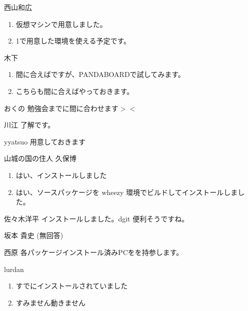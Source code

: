 \documentclass[mingoth,a4paper]{jsarticle}
\begin{document}
\begin{prework}{ 西山和広 }
  \begin{enumerate}
  \item 仮想マシンで用意しました。
  \item 1で用意した環境を使える予定です。
  \end{enumerate}
\end{prework}

\begin{prework}{ 木下 }
  \begin{enumerate}
  \item 間に合えばですが、PANDABOARDで試してみます。
  \item こちらも間に合えばやっておきます。
  \end{enumerate}
\end{prework}

\begin{prework}{ おくの }
勉強会までに間に合わせます$><$
\end{prework}

\begin{prework}{ 川江 }
了解です。
\end{prework}

\begin{prework}{ yyatsuo }
用意しておきます
\end{prework}

\begin{prework}{ 山城の国の住人 久保博 }
  \begin{enumerate}
  \item はい、インストールしました
  \item はい、ソースパッケージを wheezy 環境でビルドしてインストールしました。
  \end{enumerate}
\end{prework}

\begin{prework}{ 佐々木洋平 }
インストールしました。dgit 便利そうですね。
\end{prework}

\begin{prework}{ 坂本 貴史 }
(無回答)
\end{prework}

\begin{prework}{ 西原 }
各パッケージインストール済みPCをを持参します。
\end{prework}

\begin{prework}{ lurdan }
  \begin{enumerate}
  \item すでにインストールされていました
  \item すみません動きません
  \end{enumerate}
\end{prework}
\end{document}
